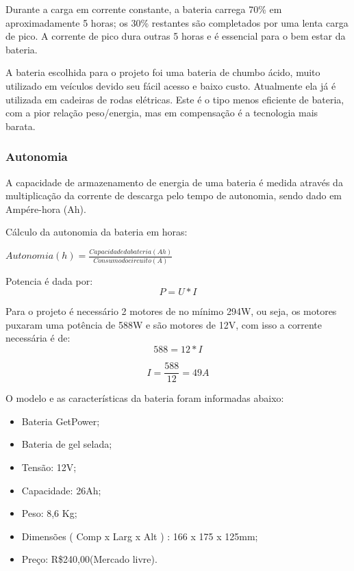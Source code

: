 Durante a carga em corrente constante, a bateria carrega 70\% em aproximadamente 5 horas; os 30\% restantes são completados por uma lenta carga de pico. A corrente de pico dura outras 5 horas e é essencial para o bem estar da bateria.

A bateria escolhida para o projeto foi uma bateria de chumbo ácido, muito utilizado em veículos devido seu fácil acesso e baixo custo. Atualmente ela já é utilizada em cadeiras de rodas elétricas. Este é o tipo menos eficiente de bateria, com a pior relação peso/energia, mas em compensação é a tecnologia mais barata.

\subsubsection{Autonomia}
A capacidade de armazenamento de energia de uma bateria é medida através da multiplicação da corrente de descarga pelo tempo de autonomia, sendo dado em Ampére-hora (Ah).

Cálculo da autonomia da bateria em horas:

$Autonomia(h) = \frac{Capacidade da bateria(Ah)}{Consumo do circuito(A)}$

Potencia é dada por:
\begin{equation}
 P=U*I
\end{equation}

Para o projeto é necessário 2 motores de no mínimo 294W, ou seja, os motores puxaram uma potência de 588W e são motores de 12V, com isso a corrente necessária é de:
\begin{equation}
588 = 12 * I
\end{equation}

\begin{equation}
I = \frac{588}{12} = 49A
\end{equation}


O modelo e as características da bateria foram informadas abaixo:

\begin{itemize}
 \item Bateria GetPower;
 \item Bateria de gel selada;
 \item Tensão: 12V;
 \item Capacidade: 26Ah;
 \item Peso: 8,6 Kg;
 \item Dimensões ( Comp x Larg x Alt ) : 166 x 175 x 125mm;
 \item Preço: R\$240,00(Mercado livre).
\end{itemize}

